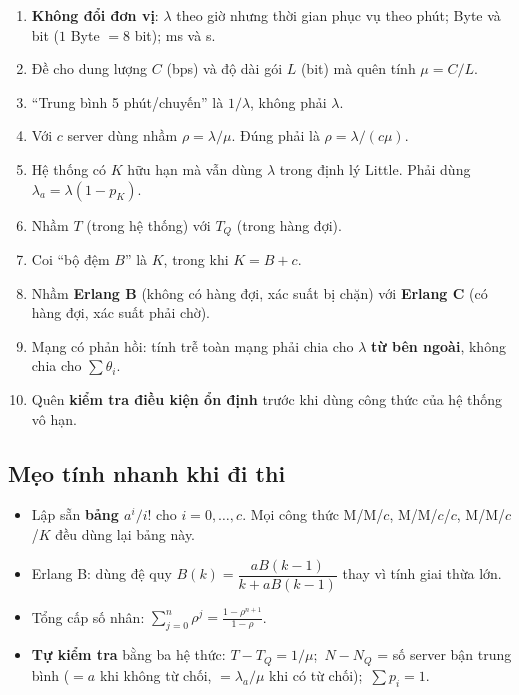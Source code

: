 \begin{luuy}
\begin{enumerate}[leftmargin=1.5em]
  \item \textbf{Không đổi đơn vị}: $\lambda$ theo giờ nhưng thời gian phục vụ theo phút; Byte và bit ($1$ Byte $= 8$ bit); ms và s.
  \item Đề cho dung lượng $C$ (bps) và độ dài gói $L$ (bit) mà quên tính \textbf{$\mu = C/L$}.
  \item “Trung bình 5 phút/chuyến” là \textbf{$1/\lambda$}, không phải $\lambda$.
  \item Với $c$ server dùng nhầm $\rho = \lambda/\mu$. Đúng phải là \textbf{$\rho = \lambda/(c\mu)$}.
  \item Hệ thống có $K$ hữu hạn mà vẫn dùng $\lambda$ trong định lý Little. Phải dùng \textbf{$\lambda_a = \lambda(1-p_K)$}.
  \item Nhầm \textbf{$T$} (trong hệ thống) với \textbf{$T_Q$} (trong hàng đợi).
  \item Coi “bộ đệm $B$” là $K$, trong khi $K = B + c$.
  \item Nhầm \textbf{Erlang B} (không có hàng đợi, xác suất bị chặn) với \textbf{Erlang C} (có hàng đợi, xác suất phải chờ).
  \item Mạng có phản hồi: tính trễ toàn mạng phải chia cho $\lambda$ \textbf{từ bên ngoài}, không chia cho $\sum\theta_i$.
  \item Quên \textbf{kiểm tra điều kiện ổn định} trước khi dùng công thức của hệ thống vô hạn.
\end{enumerate}
\end{luuy}

\subsection{Mẹo tính nhanh khi đi thi}

\begin{itemize}
  \item Lập sẵn \textbf{bảng $a^i/i!$} cho $i = 0,\dots,c$. Mọi công thức M/M/$c$, M/M/$c$/$c$, M/M/$c$/$K$ đều dùng lại bảng này.
  \item Erlang B: dùng đệ quy $B(k) = \dfrac{aB(k-1)}{k+aB(k-1)}$ thay vì tính giai thừa lớn.
  \item Tổng cấp số nhân: $\displaystyle\sum_{j=0}^{n}\rho^j = \frac{1-\rho^{n+1}}{1-\rho}$.
  \item \textbf{Tự kiểm tra} bằng ba hệ thức: $T - T_Q = 1/\mu$;\ $N - N_Q$ = số server bận trung bình ($= a$ khi không từ chối, $= \lambda_a/\mu$ khi có từ chối);\ $\sum p_i = 1$.
\end{itemize}
